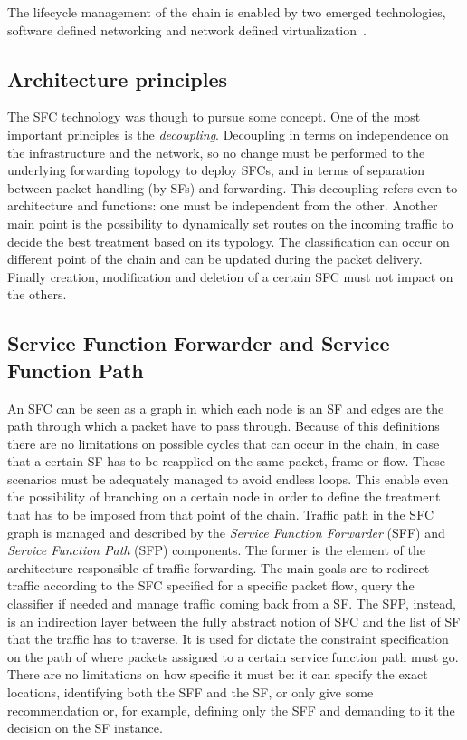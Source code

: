 The lifecycle management of the chain is enabled by two emerged technologies,
software defined networking and network defined
virtualization~\cite{medhat2017service}.

\subsection{Architecture principles}
The SFC technology was though to pursue some concept. One of the most important
principles is the \emph{decoupling}. Decoupling in terms on independence on the
infrastructure and the network, so no change must be performed to the
underlying forwarding topology to deploy SFCs, and in terms of separation
between packet handling (by SFs) and forwarding. This decoupling refers even to
architecture and functions: one must be independent from the other. Another main
point is the possibility to dynamically set routes on the incoming traffic to
decide the best treatment based on its typology. The classification can occur on
different point of the chain and can be updated during the packet delivery.
Finally creation, modification and deletion of a certain SFC must not impact on
the others.

\subsection{Service Function Forwarder and Service Function Path}
An SFC can be seen as a graph in which each node is an SF and edges are the path
through which a packet have to pass through. Because of this definitions there
are no limitations on possible cycles that can occur in the chain, in case that
a certain SF has to be reapplied on the same packet, frame or flow. These
scenarios must be adequately managed to avoid endless loops. This enable even
the possibility of branching on a certain node in order to define the treatment
that has to be imposed from that point of the chain. Traffic path in the SFC
graph is managed and described by the \emph{Service Function Forwarder} (SFF)
and \emph{Service Function Path} (SFP) components. The former is the element of
the architecture responsible of traffic forwarding. The main goals are to
redirect traffic according to the SFC specified for a specific packet flow,
query the classifier if needed and manage traffic coming back from a SF. The
SFP, instead, is an indirection layer between the fully abstract notion of SFC
and the list of SF that the traffic has to traverse. It is used for dictate the
constraint specification on the path of where packets assigned to a certain
service function path must go. There are no limitations on how specific it must
be: it can specify the exact locations, identifying both the SFF and the SF, or
only give some recommendation or, for example, defining only the SFF and
demanding to it the decision on the SF instance.

